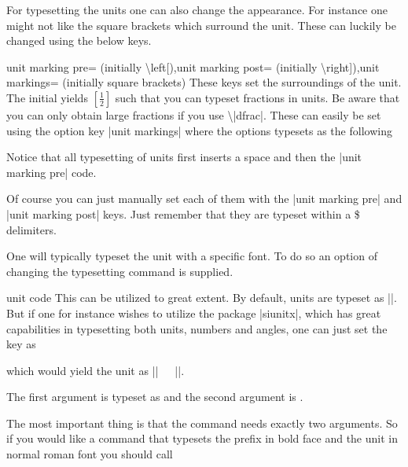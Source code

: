 For typesetting the units one can also change the appearance. For instance one
might not like the square brackets which surround the unit. These can luckily
be changed using the below keys.

\begin{pgfplotskeylist}{unit marking pre= (initially \textbackslash left[),unit marking post= (initially \textbackslash right]),unit markings= (initially square brackets)}
    These keys set the surroundings of the unit. The initial yields
    $\left[\frac{1}{2}\right]$ such that you can typeset fractions in units. Be
    aware that you can only obtain large fractions if you use
    \textbackslash|dfrac|. These can easily be set using the option key
    |unit markings| where the options typesets as the following
\begin{codeexample}
\pgfplotsset{x unit=T,unit markings=parenthesis} %
\pgfplotsset{x unit=T,unit markings=square brackets} %
\pgfplotsset{x unit=T,unit markings=slash space} %
\end{codeexample}
    Notice that all typesetting of units first inserts a space and then the
    |unit marking pre| code.

    Of course you can just manually set each of them with the
    |unit marking pre| and |unit marking post| keys. Just remember that they
    are typeset within a \$ delimiters.
\end{pgfplotskeylist}

One will typically typeset the unit with a specific font. To do so an option of
changing the typesetting command is supplied.

\begin{pgfplotscodetwokey}{unit code}%
    This can be utilized to great extent. By default, units are typeset as
    ||. But if one for instance wishes
    to utilize the package |siunitx|, which has great capabilities in
    typesetting both units, numbers and angles, one can just set the key as
\begin{codeexample}
\end{codeexample}
    which would yield the unit as |\si{||}|.

    The first argument is typeset as  and the second argument
    is .

    The most important thing is that the command needs exactly two arguments.
    So if you would like a command that typesets the prefix in bold face and
    the unit in normal roman font you should call
\begin{codeexample}[code only]
\pgfplotsset{unit code/.code 2 args={\mathbf{#1}\mathrm{#2}}
\end{codeexample}
\end{pgfplotscodetwokey}


